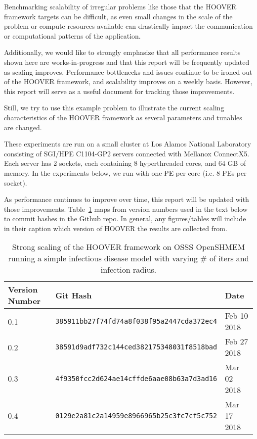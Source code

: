 Benchmarking scalability of irregular problems like those that the HOOVER
framework targets can be difficult, as even small changes in the scale of the
problem or compute resources available can drastically impact the communication
or computational patterns of the application.

Additionally, we would like to strongly emphasize that all performance results shown here
are works-in-progress and that this report will be frequently updated as scaling
improves. Performance bottlenecks and issues continue to be ironed
out of the HOOVER framework, and scalability improves on a weekly basis.
However, this report will serve as a useful document for tracking those
improvements.

Still, we try to use this example problem to illustrate the current scaling
characteristics of the HOOVER framework as several parameters and tunables are
changed.

These experiments are run on a small cluster at Los Alamos National Laboratory
consisting of SGI/HPE C1104-GP2 servers connected with Mellanox ConnectX5.
Each server has 2 sockets, each containing 8 hyperthreaded cores, and 64 GB of
memory. In the experiments below, we run with one PE per core (i.e. 8 PEs per
socket).

As performance continues to improve over time, this report will be updated with
those improvements. Table~\ref{tab:hoover_versions} maps from version numbers used in the text
below to commit hashes in the Github repo. In general, any figures/tables will
include in their caption which version of HOOVER the results are collected from.

\begin{table}
\centering
\begin{tabular}{ | l | l | l | }
\hline
\textbf{Version Number} & \textbf{Git Hash}                         & \textbf{Date} \\\hline
0.1                     & \texttt{385911bb27f74fd74a8f038f95a2447cda372ec4}  & Feb 10 2018 \\\hline
0.2                     & \texttt{38591d9adf732c144ced382175348031f8518bad}  & Feb 27 2018 \\\hline
0.3                     & \texttt{4f9350fcc2d624ae14cffde6aae08b63a7d3ad16}  & Mar 02 2018 \\\hline
0.4                     & \texttt{0129e2a81c2a14959e8966965b25c3fc7cf5c752}  & Mar 17 2018 \\\hline
\end{tabular}
\caption{Strong scaling of the HOOVER framework on OSSS OpenSHMEM running a
    simple infectious disease model with varying \# of iters and infection
    radius.}
\label{tab:hoover_versions}
\end{table}

